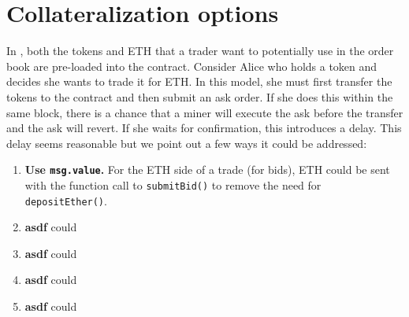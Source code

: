 \section{Collateralization options}

In \cm, both the tokens and ETH that a trader want to potentially use in the order book are pre-loaded into the contract. Consider Alice who holds a token and decides she wants to trade it for ETH. In this model, she must first transfer the tokens to the contract and then submit an ask order. If she does this within the same block, there is a chance that a miner will execute the ask before the transfer and the ask will revert. If she waits for confirmation, this introduces a delay. This delay seems reasonable but we point out a few ways it could be addressed: 

\begin{enumerate}

\item \textbf{Use \texttt{msg.value}.} For the ETH side of a trade (\ie for bids), ETH could be sent with the function call to \texttt{submitBid()} to remove the need for \texttt{depositEther()}. 

\item \textbf{asdf} \cm could

\item \textbf{asdf} \cm could

\item \textbf{asdf} \cm could

\item \textbf{asdf} \cm could

\end{enumerate}

%
%



